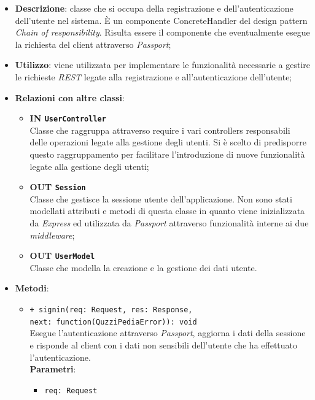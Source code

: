 \begin{itemize}
	\item 
	\textbf{Descrizione}:
	classe che si occupa della registrazione e dell'autenticazione dell'utente nel sistema. È un componente ConcreteHandler del design pattern \textit{Chain of responsibility}. Risulta essere il componente che eventualmente esegue la richiesta del client attraverso \textit{Passport};
	\item
	\textbf{Utilizzo}:
	viene utilizzata per implementare le funzionalità necessarie a gestire le richieste \textit{REST} legate alla registrazione e all'autenticazione dell'utente;
	\item
	\textbf{Relazioni con altre classi}:
	\begin{itemize}
		\item
		\textbf{IN \texttt{UserController}} \\
		Classe che raggruppa attraverso require i vari controllers responsabili delle operazioni legate alla gestione degli utenti. Si è scelto di predisporre questo raggruppamento per facilitare l'introduzione di nuove funzionalità legate alla gestione degli utenti;
		\item
		\textbf{OUT \texttt{Session}} \\
		Classe che gestisce la sessione utente dell'applicazione. Non sono stati modellati attributi e metodi di questa classe in quanto viene inizializzata da \textit{Express} ed utilizzata da \textit{Passport} attraverso funzionalità interne ai due \textit{middleware};
		\item
		\textbf{OUT \texttt{UserModel}} \\
		Classe che modella la creazione e la gestione dei dati utente.
	\end{itemize}
	\item
	\textbf{Metodi}:
	\begin{itemize}
		\item
		\texttt{+ signin(req: Request, res: Response, \\next: function(QuzziPediaError)): void} \\
		Esegue l'autenticazione attraverso \textit{Passport}, aggiorna i dati della sessione e risponde al client con i dati non sensibili dell'utente che ha effettuato l'autenticazione. \\
		\textbf{Parametri}:
		 \begin{itemize}
		  \item
			\texttt{req: Request} \\

\end{itemize}
\end{itemize}
\end{itemize}
